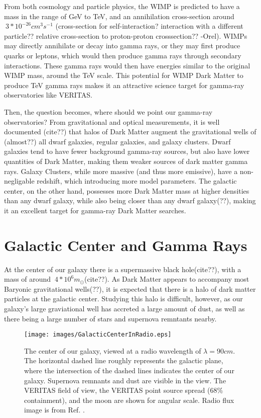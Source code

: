 From both cosmology and particle physics, the WIMP is predicted to have a mass in the range of GeV to TeV, and an annihilation cross-section around $~3*10^{-26} cm^{3}s^{-1}$ (cross-section for self-interaction? interaction with a different particle?? relative cross-section to proton-proton crosssection?? -Orel).
WIMPs may directly annihilate or decay into gamma rays, or they may first produce quarks or leptons, which would then produce gamma rays through secondary interactions.
These gamma rays would then have energies similar to the original WIMP mass, around the TeV scale.
This potential for WIMP Dark Matter to produce TeV gamma rays makes it an attractive science target for gamma-ray observatories like VERITAS.

Then, the question becomes, where should we point our gamma-ray observatories?
From gravitational and optical measurements, it is well documented (cite??) that halos of Dark Matter augment the gravitational wells of (almost??) all dwarf galaxies, regular galaxies, and galaxy clusters.
Dwarf galaxies tend to have fewer background gamma-ray sources, but also have lower quantities of Dark Matter, making them weaker sources of dark matter gamma rays.
Galaxy Clusters, while more massive (and thus more emissive), have a non-negligable redshift, which introducing more model parameters.
The galactic center, on the other hand, possesses more Dark Matter mass at higher densities than any dwarf galaxy, while also being closer than any dwarf galaxy(??), making it an excellent target for gamma-ray Dark Matter searches.


\section{Galactic Center and Gamma Rays}

At the center of our galaxy there is a supermassive black hole(cite??), with a mass of around $~4*10^6m_{\odot}$(cite??).
As Dark Matter appears to accompany most Baryonic gravitational wells(??), it is expected that there is a halo of dark matter particles at the galactic center.
Studying this halo is difficult, however, as our galaxy's large graviational well has accreted a large amount of dust, as well as there being a large number of stars and supernova remntants nearby.

\begin{figure}[ht]
  \begin{center}
    \texttt{[image: images/GalacticCenterInRadio.eps]}
    \caption[Galactic Center in Radio]{The center of our galaxy, viewed at a radio wavelength of $\lambda=90cm$.  The horizontal dashed line roughly represents the galactic plane, where the intersection of the dashed lines indicates the center of our galaxy.  Supernova remnants and dust are visible in the view.  The VERITAS field of view, the VERITAS point source spread (68\% containment), and the moon are shown for angular scale.  Radio flux image is from Ref. \cite{galactic_center_in_radio}.}
  \end{center}
\end{figure}

